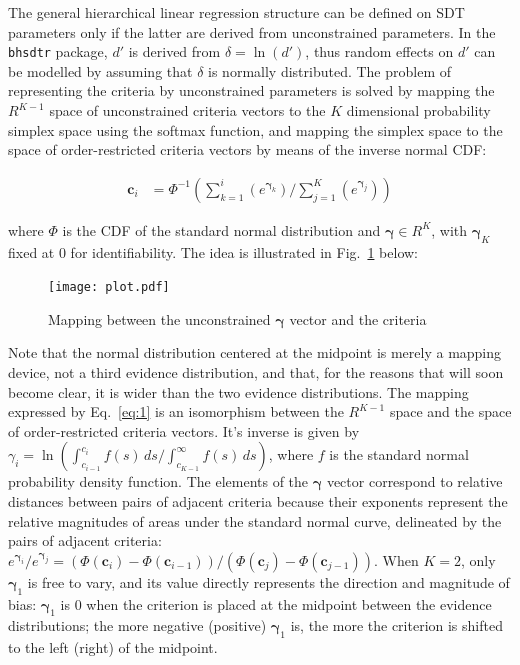 \documentclass[a4paper,man,apacite,floatsintext]{apa6}
\newcommand{\code}[1]{\texttt{#1}}
\begin{document}
The general hierarchical linear regression structure can be defined on
SDT parameters only if the latter are derived from unconstrained
parameters. In the \code{bhsdtr} package, $d'$ is derived from
$\delta = \ln(d')$, thus random effects on $d'$ can be modelled by
assuming that $\delta$ is normally distributed. The problem of
representing the criteria by unconstrained parameters is solved by
mapping the $R^{K-1}$ space of unconstrained criteria vectors to the
$K$ dimensional probability simplex space using the softmax function,
and mapping the simplex space to the space of order-restricted
criteria vectors by means of the inverse normal CDF:

\begin{align}
  \bm{c}_i &= \Phi^{-1}(\sum_{k = 1}^i(e^{\bm{\gamma}_k}) /
             \sum_{j=1}^K(e^{\bm{\gamma}_j}))
\label{eq:1}
\end{align}

\noindent where $\Phi$ is the CDF of the standard normal distribution
and $\bm{\gamma} \in R^K$, with $\bm{\gamma}_K$ fixed at $0$ for
identifiability. The idea is illustrated in Fig.~\ref{fig:2} below:

\begin{figure}[H]
  \centering
  \texttt{[image: plot.pdf]}
  \caption{Mapping between the unconstrained $\bm{\gamma}$ vector and
    the criteria}
  \label{fig:2}
\end{figure}

Note that the normal distribution centered at the midpoint is merely a
mapping device, not a third evidence distribution, and that, for the
reasons that will soon become clear, it is wider than the two evidence
distributions. The mapping expressed by Eq.~\ref{eq:1} is an
isomorphism between the $R^{K-1}$ space and the space of
order-restricted criteria vectors. It's inverse is given by
$\gamma_i =\ln{(\int_{c_{i-1}}^{c_i} f(s) \,ds /
  \int_{c_{K-1}}^{\infty} f(s) \, ds)}$, where $f$ is the standard
normal probability density function. The elements of the $\bm{\gamma}$
vector correspond to relative distances between pairs of adjacent
criteria because their exponents represent the relative magnitudes of
areas under the standard normal curve, delineated by the pairs of
adjacent criteria:
$e^{\bm{\gamma}_i} / e^{\bm{\gamma}_j} = (\Phi(\bm{c}_i) -
\Phi(\bm{c}_{i-1})) / (\Phi(\bm{c}_j) - \Phi(\bm{c}_{j-1}))$. When
$K=2$, only $\bm{\gamma}_1$ is free to vary, and its value directly
represents the direction and magnitude of bias: $\bm{\gamma}_1$ is $0$
when the criterion is placed at the midpoint between the evidence
distributions; the more negative (positive) $\bm{\gamma}_1$ is, the
more the criterion is shifted to the left (right) of the midpoint.
\end{document}
